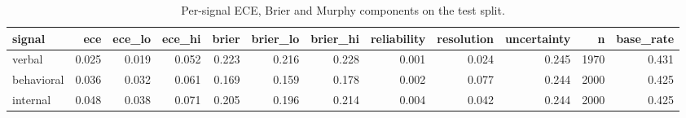 \begin{table}
\caption{Per-signal ECE, Brier and Murphy components on the test split.}
\label{tab:t6_h1_murphy_decomposition}
\begin{tabular}{lrrrrrrrrrrr}
\toprule
signal & ece & ece\_lo & ece\_hi & brier & brier\_lo & brier\_hi & reliability & resolution & uncertainty & n & base\_rate \\
\midrule
verbal & 0.025 & 0.019 & 0.052 & 0.223 & 0.216 & 0.228 & 0.001 & 0.024 & 0.245 & 1970 & 0.431 \\
behavioral & 0.036 & 0.032 & 0.061 & 0.169 & 0.159 & 0.178 & 0.002 & 0.077 & 0.244 & 2000 & 0.425 \\
internal & 0.048 & 0.038 & 0.071 & 0.205 & 0.196 & 0.214 & 0.004 & 0.042 & 0.244 & 2000 & 0.425 \\
\bottomrule
\end{tabular}
\end{table}
